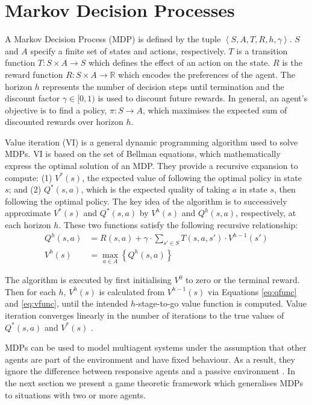 \section{Markov Decision Processes}
\label{sec:mdp}

A Markov Decision Process (MDP) \cite{Howard_1960} is defined by the tuple
$ \left\langle S, A, T, R, h, \gamma \right\rangle$. $S$ and $A$ 
specify a finite set of states and actions, respectively.
$T$ is a transition function $T : S \times A \rightarrow S$ which 
defines the effect of an action on the state. $R$ is the
reward function $R : S \times A \rightarrow \mathbb{R}$ which 
encodes the preferences of the agent. The horizon $h$ represents the 
number of decision steps until termination and the discount factor $\gamma \in [0, 1)$ 
is used to discount future rewards. In general, an agent's objective is 
to find a policy, $\pi : S \rightarrow A$, which maximises the expected 
sum of discounted rewards over horizon $h$.

Value iteration (VI) \cite{Bellman_1957} is a general dynamic programming 
algorithm used to solve MDPs. VI is based on the set of Bellman equations,
which mathematically express the optimal solution of an MDP. They 
provide a recursive expansion to compute: (1) $V^{*}(s)$, the expected value of following
the optimal policy in state $s$; and (2) $Q^{*}(s, a)$, which is the expected
quality of taking $a$ in state $s$, then following the optimal policy. The
key idea of the algorithm is to successively approximate $V^{*}(s)$ and $Q^{*}(s, a)$
by $V^{h}(s)$ and $Q^{h}(s, a)$, respectively, at each horizon $h$. These 
two functions satisfy the following recursive relationship:
{\small 
\begin{align}
  Q^{h}(s, a) &= R(s, a) + \gamma \cdot \sum_{s' \in S} T(s, a, s') \cdot V^{h-1}(s') \label{eq:qfunc}\\
  V^{h}(s) &= \max_{a \in A} \left\{ Q^{h}(s, a) \right\} \label{eq:vfunc}
\end{align}
}%

The algorithm is executed by first initialising $V^{0}$  to zero or the terminal reward. 
Then for each $h$, $V^{h}(s)$ is calculated from $V^{h-1}(s)$ via
Equations \eqref{eq:qfunc} and \eqref{eq:vfunc}, until the intended 
$h$-stage-to-go value function is computed. Value iteration converges 
linearly in the number of iterations to the true values of $Q^{*}(s, a)$ and $V^{*}(s)$ 
\cite{Bertsekas_1987}.

MDPs can be used to model multiagent systems under the assumption 
that other agents are part of the environment and have fixed behaviour. 
As a result, they ignore the difference between responsive agents and 
a passive environment \cite{Hu_ICML_1998}. In the next section we 
present a game theoretic framework which generalises MDPs to 
situations with two or more agents.